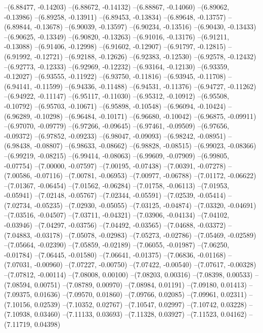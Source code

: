 --(6.88477, -0.14203)
--(6.88672, -0.14132)
--(6.88867, -0.14060)
--(6.89062, -0.13986)
--(6.89258, -0.13911)
--(6.89453, -0.13834)
--(6.89648, -0.13757)
--(6.89844, -0.13678)
--(6.90039, -0.13597)
--(6.90234, -0.13516)
--(6.90430, -0.13433)
--(6.90625, -0.13349)
--(6.90820, -0.13263)
--(6.91016, -0.13176)
--(6.91211, -0.13088)
--(6.91406, -0.12998)
--(6.91602, -0.12907)
--(6.91797, -0.12815)
--(6.91992, -0.12721)
--(6.92188, -0.12626)
--(6.92383, -0.12530)
--(6.92578, -0.12432)
--(6.92773, -0.12333)
--(6.92969, -0.12232)
--(6.93164, -0.12130)
--(6.93359, -0.12027)
--(6.93555, -0.11922)
--(6.93750, -0.11816)
--(6.93945, -0.11708)
--(6.94141, -0.11599)
--(6.94336, -0.11488)
--(6.94531, -0.11376)
--(6.94727, -0.11262)
--(6.94922, -0.11147)
--(6.95117, -0.11030)
--(6.95312, -0.10912)
--(6.95508, -0.10792)
--(6.95703, -0.10671)
--(6.95898, -0.10548)
--(6.96094, -0.10424)
--(6.96289, -0.10298)
--(6.96484, -0.10171)
--(6.96680, -0.10042)
--(6.96875, -0.09911)
--(6.97070, -0.09779)
--(6.97266, -0.09645)
--(6.97461, -0.09509)
--(6.97656, -0.09372)
--(6.97852, -0.09233)
--(6.98047, -0.09093)
--(6.98242, -0.08951)
--(6.98438, -0.08807)
--(6.98633, -0.08662)
--(6.98828, -0.08515)
--(6.99023, -0.08366)
--(6.99219, -0.08215)
--(6.99414, -0.08063)
--(6.99609, -0.07909)
--(6.99805, -0.07754)
--(7.00000, -0.07597)
--(7.00195, -0.07438)
--(7.00391, -0.07278)
--(7.00586, -0.07116)
--(7.00781, -0.06953)
--(7.00977, -0.06788)
--(7.01172, -0.06622)
--(7.01367, -0.06454)
--(7.01562, -0.06284)
--(7.01758, -0.06113)
--(7.01953, -0.05941)
--(7.02148, -0.05767)
--(7.02344, -0.05591)
--(7.02539, -0.05414)
--(7.02734, -0.05235)
--(7.02930, -0.05055)
--(7.03125, -0.04874)
--(7.03320, -0.04691)
--(7.03516, -0.04507)
--(7.03711, -0.04321)
--(7.03906, -0.04134)
--(7.04102, -0.03946)
--(7.04297, -0.03756)
--(7.04492, -0.03565)
--(7.04688, -0.03372)
--(7.04883, -0.03178)
--(7.05078, -0.02983)
--(7.05273, -0.02786)
--(7.05469, -0.02589)
--(7.05664, -0.02390)
--(7.05859, -0.02189)
--(7.06055, -0.01987)
--(7.06250, -0.01784)
--(7.06445, -0.01580)
--(7.06641, -0.01375)
--(7.06836, -0.01168)
--(7.07031, -0.00960)
--(7.07227, -0.00750)
--(7.07422, -0.00540)
--(7.07617, -0.00328)
--(7.07812, -0.00114)
--(7.08008, 0.00100)
--(7.08203, 0.00316)
--(7.08398, 0.00533)
--(7.08594, 0.00751)
--(7.08789, 0.00970)
--(7.08984, 0.01191)
--(7.09180, 0.01413)
--(7.09375, 0.01636)
--(7.09570, 0.01860)
--(7.09766, 0.02085)
--(7.09961, 0.02311)
--(7.10156, 0.02539)
--(7.10352, 0.02767)
--(7.10547, 0.02997)
--(7.10742, 0.03228)
--(7.10938, 0.03460)
--(7.11133, 0.03693)
--(7.11328, 0.03927)
--(7.11523, 0.04162)
--(7.11719, 0.04398)

